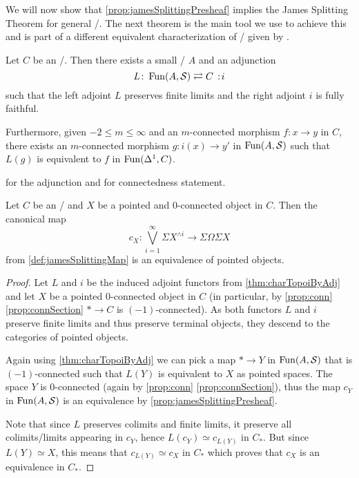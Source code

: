 We will now show that \cref{prop:jamesSplittingPresheaf} implies the James Splitting Theorem for general \inftytops/.
The next theorem is the main tool we use to achieve this and is part of a different equivalent characterization of \inftytops/ given by \cite[Theorem 6.1.0.6]{HTT}.
\begin{thm}\label{thm:charTopoiByAdj}
    Let $C$ be an \inftytop/.
    Then there exists a small \inftycat/ $A$ and an adjunction
    \begin{equation*}
        L\colon\Fun(A,\spaces)\rightleftarrows C\mkern+3mu:\mkern-3mu i
    \end{equation*}
    such that the left adjoint $L$ preserves finite limits and the right adjoint $i$ is fully faithful.

    Furthermore, given $-2\leq m\leq\infty$ and an $m$-connected morphism $f\colon x\to y$ in $C$, there exists an $m$-connected morphism $g\colon i(x)\to y'$ in $\operatorname{Fun}(A,\mathcal{S})$ such that $L(g)$ is equivalent to $f$ in $\operatorname{Fun}(\Delta^1,C)$.
    \begin{reference}
        \cite[Theorem 6.1.0.6 (1) and (2)]{HTT} for the adjunction and \cite[Remark 6.5.1.15]{HTT} for connectedness statement.
    \end{reference}
\end{thm}
\begin{corollary}\label{lem:genTopoiComparisonMapEq}
    Let $C$ be an \inftytop/ and $X$ be a pointed and $0$-connected object in $C$.
    Then the canonical map 
    \begin{equation*}
        c_X\colon\bigvee\limits_{i=1}^{\infty}\Sigma X^{\wedge i}\to\Sigma\Omega\Sigma X
    \end{equation*}
    from \cref{def:jamesSplittingMap} is an equivalence of pointed objects.
    \begin{proof}
        Let $L$ and $i$ be the induced adjoint functors from \cref{thm:charTopoiByAdj} and let $X$ be a pointed $0$-connected object in $C$ (in particular, by \cref{prop:conn} \ref{prop:connSection} $*\to C$ is $(-1)$-connected).
        As both functors $L$ and $i$ preserve finite limits and thus preserve terminal objects, they descend to the categories of pointed objects.
        
        Again using \cref{thm:charTopoiByAdj} we can pick a map $*\to Y$ in $\operatorname{Fun}(A,\mathcal{S})$ that is $(-1)$-connected such that $L(Y)$ is equivalent to $X$ as pointed spaces.
        The space $Y$ is $0$-connected (again by \cref{prop:conn} \ref{prop:connSection}), thus the map $c_Y$ in $\operatorname{Fun}(A,\mathcal{S})$ is an equivalence by \cref{prop:jamesSplittingPresheaf}.
        
        Note that since $L$ preserves colimits and finite limits, it preserve all colimits/limits appearing in $c_Y$, hence $L(c_Y)\simeq c_{L(Y)}$ in $C_*$.
        But since $L(Y)\simeq X$, this means that $c_{L(Y)}\simeq c_X$ in $C_*$ which proves that $c_X$ is an equivalence in $C_*$.
    \end{proof}
\end{corollary}
